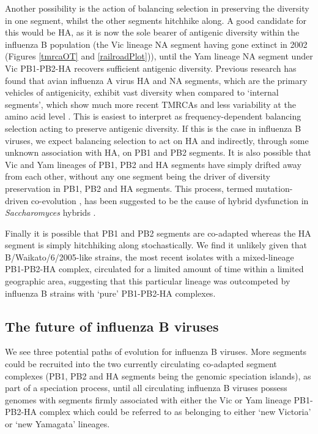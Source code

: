 \documentclass[11pt,oneside,letterpaper]{article}
\begin{document}
Another possibility is the action of balancing selection in preserving the diversity in one segment, whilst the other segments hitchhike along.
A good candidate for this would be HA, as it is now the sole bearer of antigenic diversity within the influenza B population (the Vic lineage NA segment having gone extinct in 2002 (Figures \ref{tmrcaOT} and \ref{railroadPlot})), until the Yam lineage NA segment under Vic PB1-PB2-HA recovers sufficient antigenic diversity.
Previous research has found that avian influenza A virus HA and NA segments, which are the primary vehicles of antigenicity, exhibit vast diversity when compared to `internal segments', which show much more recent TMRCAs and less variability at the amino acid level \cite{chen2006,obenauer2006}.
This is easiest to interpret as frequency-dependent balancing selection acting to preserve antigenic diversity.
If this is the case in influenza B viruses, we expect balancing selection to act on HA and indirectly, through some unknown association with HA, on PB1 and PB2 segments.
It is also possible that Vic and Yam lineages of PB1, PB2 and HA segments have simply drifted away from each other, without any one segment being the driver of diversity preservation in PB1, PB2 and HA segments.
This process, termed mutation-driven co-evolution \cite{presgraves2010}, has been suggested to be the cause of hybrid dysfunction in \textit{Saccharomyces} hybrids \cite{lee2008}.

Finally it is possible that PB1 and PB2 segments are co-adapted whereas the HA segment is simply hitchhiking along stochastically. 
We find it unlikely given that B/Waikato/6/2005-like strains, the most recent isolates with a mixed-lineage PB1-PB2-HA complex, circulated for a limited amount of time within a limited geographic area, suggesting that this particular lineage was outcompeted by influenza B strains with `pure' PB1-PB2-HA complexes.

\subsection*{The future of influenza B viruses}
We see three potential paths of evolution for influenza B viruses.
More segments could be recruited into the two currently circulating co-adapted segment complexes (PB1, PB2 and HA segments being the genomic speciation islands), as part of a speciation process, until all circulating influenza B viruses possess genomes with segments firmly associated with either the Vic or Yam lineage PB1-PB2-HA complex which could be referred to as belonging to either `new Victoria' or `new Yamagata' lineages.
\end{document}
